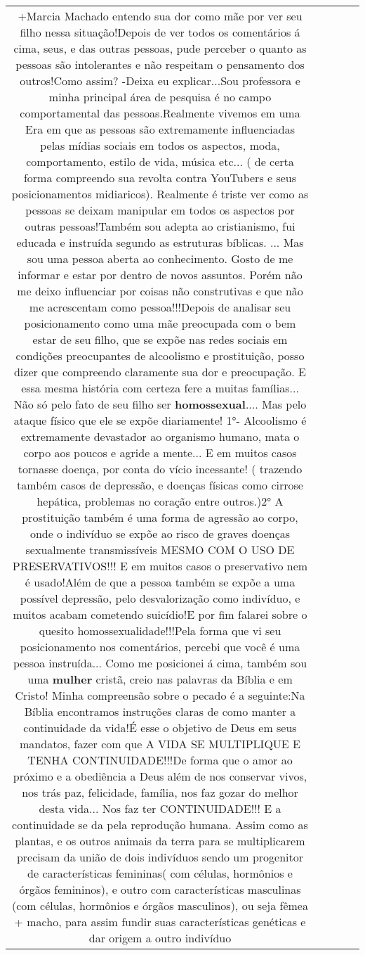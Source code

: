 \documentclass[11pt]{article}
\newlength\mylength
\begin{document}
\begin{center}
\begin{longtable}{|C{.65\mylength}|C{.30\mylength}|C{.12\mylength}|C{.12\mylength}|C{.12\mylength}|}
  \small +Marcia Machado entendo sua dor como mãe por ver seu filho nessa situação!Depois de ver todos os comentários á cima, seus, e das outras pessoas, pude perceber o quanto as pessoas são intolerantes e não respeitam o pensamento dos outros!Como assim? -Deixa eu explicar...Sou professora e minha principal área de pesquisa é no campo comportamental das pessoas.Realmente vivemos em uma Era em que as pessoas são extremamente influenciadas pelas mídias sociais em todos os aspectos, moda, comportamento, estilo de vida, música etc... ( de certa forma compreendo sua revolta contra YouTubers e seus posicionamentos midiaricos). Realmente é triste ver como as pessoas se deixam manipular em todos os aspectos por outras pessoas!Também sou adepta ao cristianismo, fui educada e instruída segundo as estruturas bíblicas. ... Mas sou uma pessoa aberta ao conhecimento. Gosto de me informar e estar por dentro de novos assuntos. Porém não me deixo influenciar por coisas não construtivas e que não me acrescentam como pessoa!!!Depois de analisar seu posicionamento como uma mãe preocupada com o bem estar de seu filho, que se expõe nas redes sociais em condições preocupantes de alcoolismo e prostituição, posso dizer que compreendo claramente sua dor e preocupação. E essa mesma história com certeza fere a muitas famílias... Não só pelo fato de seu filho ser \textbf{homossexual}.... Mas pelo ataque físico que ele se expõe diariamente! 1°- Alcoolismo é extremamente devastador ao organismo humano, mata o corpo aos poucos e agride a mente... E em muitos casos tornasse doença, por conta do vício incessante! ( trazendo também casos de depressão, e doenças físicas como cirrose hepática, problemas no coração entre outros.)2° A prostituição também é uma forma de agressão ao corpo, onde o indivíduo se expõe ao risco de graves doenças  sexualmente transmissíveis MESMO COM O USO DE PRESERVATIVOS!!! E em muitos casos o preservativo nem é usado!Além de que a pessoa também se expõe a uma possível depressão, pelo desvalorização como indivíduo, e muitos acabam cometendo suicídio!E por fim falarei sobre o quesito homossexualidade!!!Pela forma que vi seu posicionamento nos comentários, percebi que você é uma pessoa instruída... Como me posicionei á cima, também sou uma \textbf{mulher} cristã, creio nas palavras da Bíblia e em Cristo! Minha compreensão sobre o pecado é a seguinte:Na Bíblia encontramos instruções claras de como manter a continuidade da vida!É esse o objetivo de Deus em seus mandatos, fazer com que A VIDA SE MULTIPLIQUE E TENHA CONTINUIDADE!!!De forma que o amor ao próximo e a obediência a Deus além de nos conservar vivos, nos trás paz, felicidade, família, nos faz gozar do melhor desta vida... Nos faz ter CONTINUIDADE!!! E a continuidade se da pela reprodução humana. Assim como as plantas, e os outros animais da terra para se multiplicarem precisam da união de dois indivíduos sendo um progenitor de características femininas( com células,  hormônios e órgãos femininos), e outro com características masculinas (com células, hormônios e órgãos masculinos), ou seja fêmea + macho, para assim fundir suas características genéticas e dar origem a outro indivíduo 
\end{longtable}
\end{center}
\end{document}
